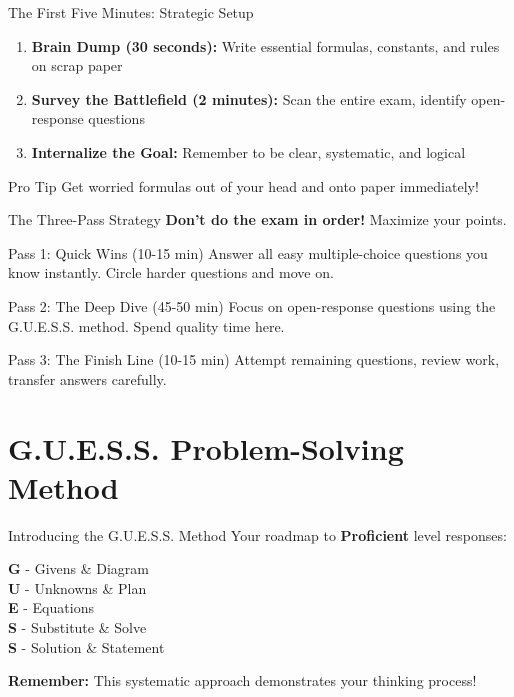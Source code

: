 \documentclass{beamer}
\begin{document}
\begin{frame}{The First Five Minutes: Strategic Setup}
\begin{enumerate}
\item \textbf{Brain Dump (30 seconds):} Write essential formulas, constants, and rules on scrap paper
\item \textbf{Survey the Battlefield (2 minutes):} Scan the entire exam, identify open-response questions
\item \textbf{Internalize the Goal:} Remember to be clear, systematic, and logical
\end{enumerate}

\vspace{0.5cm}

\begin{block}{Pro Tip}
Get worried formulas out of your head and onto paper immediately!
\end{block}
\end{frame}

\begin{frame}{The Three-Pass Strategy}
\textbf{Don't do the exam in order!} Maximize your points.

\begin{block}{Pass 1: Quick Wins (10-15 min)}
Answer all easy multiple-choice questions you know instantly. Circle harder questions and move on.
\end{block}
\begin{block}{Pass 2: The Deep Dive (45-50 min)}
Focus on open-response questions using the G.U.E.S.S. method. Spend quality time here.
\end{block}
\begin{block}{Pass 3: The Finish Line (10-15 min)}
Attempt remaining questions, review work, transfer answers carefully.
\end{block}


\end{frame}

\section{G.U.E.S.S. Problem-Solving Method}

\begin{frame}{Introducing the G.U.E.S.S. Method}
Your roadmap to \textbf{Proficient} level responses:

\vspace{0.5cm}
\begin{left}

\textbf{G} - Givens \& Diagram \\
\textbf{U} - Unknowns \& Plan \\
\textbf{E} - Equations \\
\textbf{S} - Substitute \& Solve \\
\textbf{S} - Solution \& Statement \\
\end{left}

\vspace{0.5cm}

\textbf{Remember:} This systematic approach demonstrates your thinking process!
\end{frame}
\end{document}
